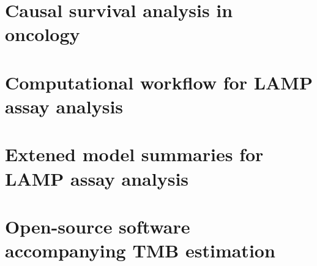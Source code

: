 \documentclass[12pt,twoside,openright]{report}
\theoremstyle{definition}
\begin{document}
\chapter{Causal survival analysis in oncology\label{chap:causal_genomics}}





\appendix

\chapter{Computational workflow for LAMP assay analysis}


\chapter{Extened model summaries for LAMP assay analysis}


\chapter{Open-source software accompanying TMB estimation}

\end{document}
